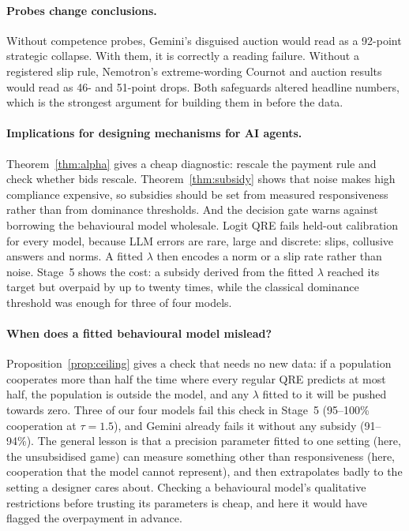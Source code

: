 \documentclass[11pt]{article}
\theoremstyle{definition}
\theoremstyle{remark}
\newcommand{\lam}{\lambda}
\begin{document}
\paragraph{Probes change conclusions.} Without competence probes, Gemini's disguised auction
would read as a 92-point strategic collapse. With them, it is correctly a reading failure.
Without a registered slip rule, Nemotron's extreme-wording Cournot and auction results would
read as 46- and 51-point drops. Both safeguards altered headline numbers, which is the strongest
argument for building them in before the data.

\paragraph{Implications for designing mechanisms for AI agents.} Theorem~\ref{thm:alpha} gives a
cheap diagnostic: rescale the payment rule and check whether bids rescale. Theorem~\ref{thm:subsidy}
shows that noise makes high compliance expensive, so subsidies should be set from measured
responsiveness rather than from dominance thresholds. And the decision gate warns against borrowing the
behavioural model wholesale. Logit QRE fails held-out calibration for every model, because LLM
errors are rare, large and discrete: slips, collusive answers and norms. A fitted $\lam$ then
encodes a norm or a slip rate rather than noise. Stage~5 shows the cost: a subsidy derived from
the fitted $\lam$ reached its target but overpaid by up to twenty times, while the classical
dominance threshold was enough for three of four models.

\paragraph{When does a fitted behavioural model mislead?} Proposition~\ref{prop:ceiling} gives a
check that needs no new data: if a population cooperates more than half the time where every
regular QRE predicts at most half, the population is outside the model, and any $\lam$ fitted to
it will be pushed towards zero. Three of our four models fail this check in Stage~5 (95--100\%
cooperation at $\tau=1.5$), and Gemini already fails it without any subsidy (91--94\%). The general lesson is that a precision parameter fitted to one
setting (here, the unsubsidised game) can measure something other than responsiveness (here,
cooperation that the model cannot represent), and then extrapolates badly to the setting a
designer cares about. Checking a behavioural model's qualitative restrictions before trusting its
parameters is cheap, and here it would have flagged the overpayment in advance.
\end{document}
